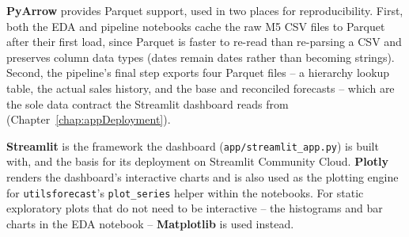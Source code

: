 \textbf{PyArrow} \cite{ApacheArrow:2026} provides Parquet support, used in two places for reproducibility. First, both the EDA and pipeline notebooks cache the raw M5 CSV files to Parquet after their first load, since Parquet is faster to re-read than re-parsing a CSV and preserves column data types (dates remain dates rather than becoming strings). Second, the pipeline's final step exports four Parquet files -- a hierarchy lookup table, the actual sales history, and the base and reconciled forecasts -- which are the sole data contract the Streamlit dashboard reads from (Chapter~\ref{chap:appDeployment}).

\textbf{Streamlit} \cite{Streamlit:2026} is the framework the dashboard (\texttt{app/streamlit\_app.py}) is built with, and the basis for its deployment on Streamlit Community Cloud. \textbf{Plotly} \cite{Plotly:2026} renders the dashboard's interactive charts and is also used as the plotting engine for \texttt{utilsforecast}'s \texttt{plot\_series} helper within the notebooks. For static exploratory plots that do not need to be interactive -- the histograms and bar charts in the EDA notebook -- \textbf{Matplotlib} \cite{Hunter:2007} is used instead.